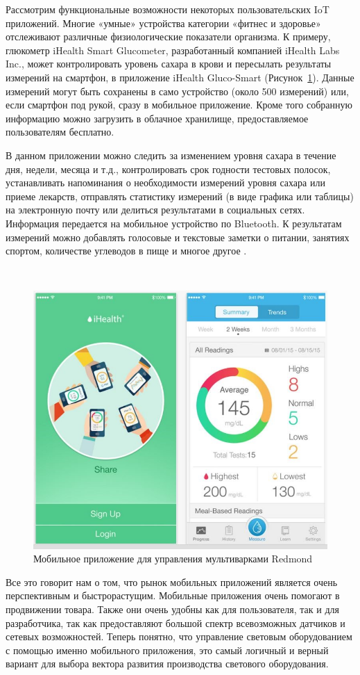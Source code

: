 Рассмотрим функциональные возможности некоторых пользовательских IoT приложений. Многие «умные» устройства категории «фитнес и здоровье» отслеживают различные физиологические показатели организма. К примеру, глюкометр iHealth Smart Glucometer, разработанный компанией iHealth Labs Inc., может контролировать уровень сахара в крови и пересылать результаты измерений на смартфон, в приложение iHealth Gluco-Smart (Рисунок~\ref{fig:subject:mobile:iHealth}). Данные измерений могут быть сохранены в само устройство (около 500 измерений) или, если смартфон под рукой, сразу в мобильное приложение. Кроме того собранную информацию можно загрузить в облачное хранилище, предоставляемое пользователям бесплатно.

В данном приложении можно следить за изменением уровня сахара в течение дня, недели, месяца и т.д., контролировать срок годности тестовых полосок, устанавливать напоминания о необходимости измерений уровня сахара или приеме лекарств, отправлять статистику измерений (в виде графика или таблицы) на электронную почту или делиться результатами в социальных сетях. Информация передается на мобильное устройство по Bluetooth. К результатам измерений можно добавлять голосовые и текстовые заметки о питании, занятиях спортом, количестве углеводов в пище и многое другое \cite{mobile_apps_iot}.

~
\begin{figure}[H]
\centering
	\includegraphics[scale=0.8]{figures/iHealth.jpg}
	\caption{Мобильное приложение для управления мультиварками Redmond}
	\label{fig:subject:mobile:iHealth}
\end{figure}

Все это говорит нам о том, что рынок мобильных приложений является очень перспективным и быстрорастущим. Мобильные приложения очень помогают в продвижении товара. Также они очень удобны как для пользователя, так и для разработчика, так как предоставляют большой спектр всевозможных датчиков и сетевых возможностей. Теперь понятно, что управление световым оборудованием с помощью именно мобильного приложения, это самый логичный и верный вариант для выбора вектора развития производства светового оборудования.